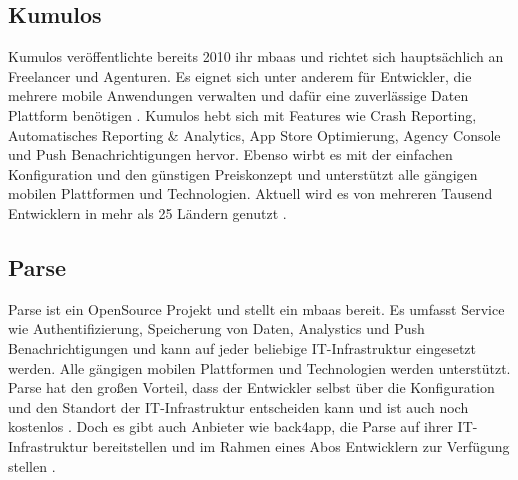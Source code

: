 \subsection{Kumulos}
Kumulos veröffentlichte bereits 2010 ihr \gls{mbaas} und richtet sich hauptsächlich an Freelancer und Agenturen. Es eignet sich unter anderem für Entwickler, die mehrere mobile Anwendungen verwalten und dafür eine zuverlässige Daten Plattform benötigen \cite{canival}. Kumulos hebt sich mit Features wie Crash Reporting, Automatisches Reporting \& Analytics, App Store Optimierung, Agency Console und Push Benachrichtigungen hervor. Ebenso wirbt es mit der einfachen Konfiguration und den günstigen Preiskonzept und unterstützt alle gängigen mobilen Plattformen und Technologien. Aktuell wird es von mehreren Tausend Entwicklern in mehr als 25 Ländern genutzt \cite{kumulos}.

\subsection{Parse}
Parse ist ein OpenSource Projekt und stellt ein \gls{mbaas} bereit. Es umfasst Service wie Authentifizierung, Speicherung von Daten, Analystics und Push Benachrichtigungen und kann auf jeder beliebige IT-Infrastruktur eingesetzt werden. Alle gängigen mobilen Plattformen und Technologien werden unterstützt. Parse hat den großen Vorteil, dass der Entwickler selbst über die Konfiguration und den Standort der IT-Infrastruktur entscheiden kann und ist auch noch kostenlos \cite{parse}. Doch es gibt auch Anbieter wie back4app, die Parse auf ihrer IT-Infrastruktur bereitstellen und im Rahmen eines Abos Entwicklern zur Verfügung stellen \cite{back4app}. 

